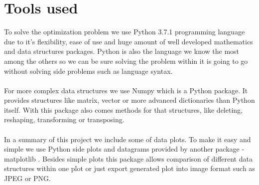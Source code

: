\documentclass[conference]{IEEEtran}
\begin{document}
\section{Tools used}
To solve the optimization problem we use Python 3.7.1 \cite{python} programming language due to it's flexibility, ease of use and huge amount of well developed mathematics and data structures packages. Python is also the language we know the most among the others so we can be sure solving the problem within it is going to go without solving side problems such as language syntax.
\\ \\
For more complex data structures we use Numpy \cite{numpy} which is a Python package. It provides structures like matrix, vector or more advanced dictionaries than Python itself. With this package also comes methods for that structures, like deleting, reshaping, transforming or transposing.
\\ \\
In a summary of this project we include some of data plots. To make it easy and simple we use Python side plots and datagrams provided by another package - matplotlib \cite{matplotlib}. Besides simple plots this package allows comparison of different data structures within one plot or just export generated plot into image format such as JPEG or PNG.
\\
\end{document}
